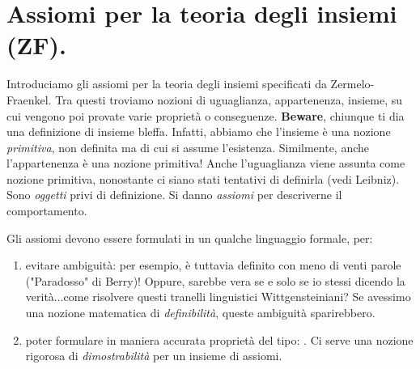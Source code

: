 \section{Assiomi per la teoria degli insiemi (ZF).}
Introduciamo gli assiomi per la teoria degli insiemi specificati da Zermelo-Fraenkel. Tra questi troviamo nozioni di uguaglianza, appartenenza, insieme, su cui vengono poi provate varie proprietà o conseguenze. {\bf Beware}, chiunque ti dia una definizione di insieme bleffa. Infatti, abbiamo che l'insieme è una nozione \emph{primitiva}, non definita ma di cui si assume l'esistenza. Similmente, anche l'appartenenza è una nozione primitiva! Anche l'uguaglianza viene assunta come nozione primitiva, nonostante ci siano stati tentativi di definirla (vedi Leibniz). Sono \emph{oggetti} privi di definizione. Si danno \emph{assiomi} per descriverne il comportamento.

Gli assiomi devono essere formulati in un qualche linguaggio formale, per:
\begin{enumerate}
  \item evitare ambiguità: per esempio,  è tuttavia definito con meno di venti parole ("Paradosso" di Berry)! Oppure,  sarebbe vera se e solo se io stessi dicendo la verità...come risolvere questi tranelli linguistici Wittgensteiniani? Se avessimo una nozione matematica di \emph{definibilità}, queste ambiguità sparirebbero.
  \item poter formulare in maniera accurata proprietà del tipo: . Ci serve una nozione rigorosa di \emph{dimostrabilità} per un insieme di assiomi.
\end{enumerate}
